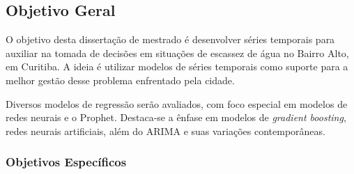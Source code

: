 \subsection{Objetivo Geral} \label{subsec:objetivos}

O objetivo desta dissertação de mestrado é desenvolver séries temporais para auxiliar na tomada de decisões em situações de escassez de água no Bairro Alto, em Curitiba. A ideia é utilizar modelos de séries temporais como suporte para a melhor gestão desse problema enfrentado pela cidade.

Diversos modelos de regressão serão avaliados, com foco especial em modelos de redes neurais e o Prophet. Destaca-se a ênfase em modelos de \textit{gradient boosting}, redes neurais artificiais, além do ARIMA e suas variações contemporâneas. 

%
    
    
\subsubsection{Objetivos Espec\'ificos} \label{subsubsec:obespec}
    

